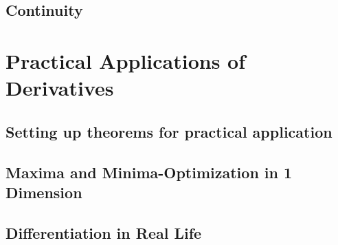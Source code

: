 \chapter{Continuity}










\part{Practical Applications of Derivatives}

\chapter{Setting up theorems for practical application}







\chapter{Maxima and Minima-Optimization in 1 Dimension}



 








\chapter{Differentiation in Real Life}

